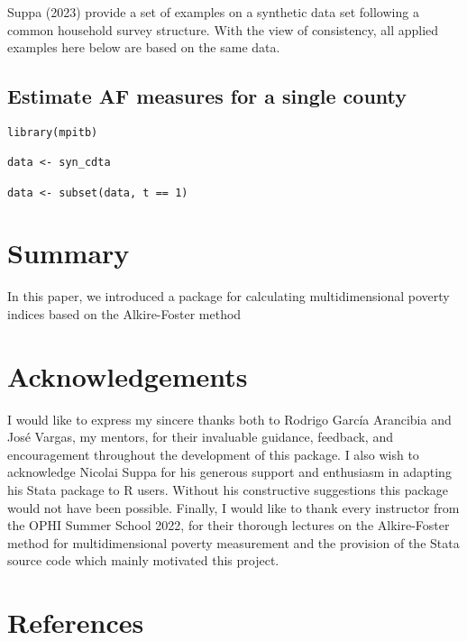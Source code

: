 Suppa (2023) provide a set of examples on a synthetic data set following a common household survey structure. With the view of consistency, all applied examples here below are based on the same data.

\hypertarget{estimate-af-measures-for-a-single-county}{%
\subsection{Estimate AF measures for a single county}\label{estimate-af-measures-for-a-single-county}}

\begin{verbatim}
library(mpitb)

data <- syn_cdta

data <- subset(data, t == 1)
\end{verbatim}

\hypertarget{summary}{%
\section{Summary}\label{summary}}

In this paper, we introduced a package for calculating multidimensional poverty indices based on the Alkire-Foster method

\hypertarget{acknowledgements}{%
\section{Acknowledgements}\label{acknowledgements}}

I would like to express my sincere thanks both to Rodrigo García Arancibia and José Vargas, my mentors, for their invaluable guidance, feedback, and encouragement throughout the development of this package. I also wish to acknowledge Nicolai Suppa for his generous support and enthusiasm in adapting his Stata package to R users. Without his constructive suggestions this package would not have been possible. Finally, I would like to thank every instructor from the OPHI Summer School 2022, for their thorough lectures on the Alkire-Foster method for multidimensional poverty measurement and the provision of the Stata source code which mainly motivated this project.

\hypertarget{references}{%
\section*{References}\label{references}}

